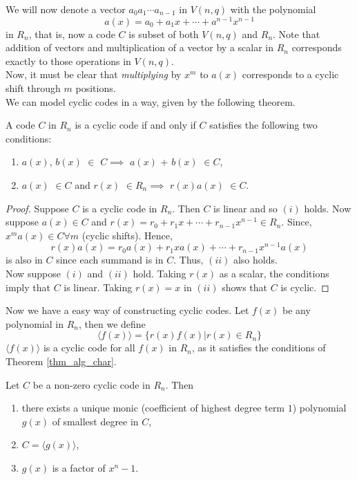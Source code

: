 \documentclass[../main.tex]{subfiles}
\newcommand{\poly}[1]{$#1(x)$}
\newcommand{\cyc}[1]{\langle #1(x) \rangle}
\begin{document}
We will now denote a vector $a_0a_1\cdots a_{n-1}$ in $V(n,q)$ with the polynomial
\[
	a(x) = a_0 + a_1x + \cdots + a^{n-1}x^{n-1}
\]
in $R_n$, that is, now a code $C$ is subset of both $V(n,q)$ and $R_n$. Note that addition of vectors and multiplication of a vector by a scalar in $R_n$ corresponds exactly to those operations in $V(n,q)$.\\
Now, it must be clear that \emph{multiplying} by $x^m$ to \poly{a} corresponds to a cyclic shift through $m$ positions.\\
We can model cyclic codes in a way, given by the following theorem.

\begin{thm}\label{thm_alg_char}
	A code $C$ in $R_n$ is a cyclic code if and only if $C$ satisfies the following two conditions: 
	\begin{enumerate}[label=(\roman*)]
		\item \poly{a}, \poly{b} $\in$ $C \implies$ \poly{a} + \poly{b} $\in C$,
		\item \poly{a} $\in C$ and \poly{r} $\in R_n \implies$ \poly{r}\poly{a} $\in C$. 
	\end{enumerate}
\end{thm}

\begin{proof}
	Suppose $C$ is a cyclic code in $R_n$. Then $C$ is linear and so $(i)$ holds. Now suppose $a(x) \in C$ and $r(x) = r_0 + r_1x + \cdots + r_{n-1}x^{n-1} \in R_n$. Since, $x^m a(x) \in C \forall m$ (cyclic shifts). Hence,
	\[
		r(x)a(x) = r_0a(x) + r_1xa(x) + \cdots + r_{n-1}x^{n-1}a(x)
	\]
	is also in $C$ since each summand is in $C$. Thus, $(ii)$ also holds.\\
	Now suppose $(i)$ and $(ii)$ hold. Taking $r(x)$ as a scalar, the conditions imply that $C$ is linear. Taking $r(x)=x$ in $(ii)$ shows that $C$ is cyclic.
\end{proof}

Now we have a easy way of constructing cyclic codes. Let $f(x)$ be any polynomial in $R_n$, then we define
\[
	\langle f(x) \rangle = \{ r(x)f(x) | r(x) \in R_n \}
\]
$\cyc{f}$ is a cyclic code for all $f(x)$ in $R_n$, as it satisfies the conditions of Theorem \ref{thm_alg_char}.

\begin{thm}\label{thm_existance_genpoly}
	Let $C$ be a non-zero cyclic code in $R_n$. Then
	\begin{enumerate}[label=(\roman*)]
		\item there exists a unique monic (coefficient of highest degree term $1$) polynomial $g(x)$ of smallest degree in $C$,
		\item $C = \cyc{g}$,
		\item $g(x)$ is a factor of $x^n-1$.\\
	\end{enumerate}
\end{thm}
\end{document}
